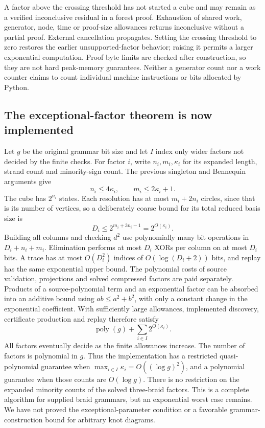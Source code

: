 A factor above the crossing threshold has not started a cube and may remain
as a verified inconclusive residual in a forest proof. Exhaustion of shared
work, generator, node, time or proof-size allowances returns inconclusive
without a partial proof. External cancellation propagates. Setting the
crossing threshold to zero restores the earlier unsupported-factor behavior;
raising it permits a larger exponential computation. Proof byte limits are
checked after construction, so they are not hard peak-memory guarantees.
Neither a generator count nor a work counter claims to count individual
machine instructions or bits allocated by Python.

\subsection{The exceptional-factor theorem is now implemented}

Let $g$ be the original grammar bit size and let $I$ index only wider factors
not decided by the finite checks. For factor $i$, write $n_i,m_i,\kappa_i$ for
its expanded length, strand count and minority-sign count. The previous
singleton and Bennequin arguments give
\[
 n_i\le4\kappa_i,\qquad m_i\le2\kappa_i+1.
\]
The cube has $2^{n_i}$ states. Each resolution has at most $m_i+2n_i$ circles,
since that is its number of vertices, so a deliberately coarse bound for its
total reduced basis size is
\[
 D_i\le 2^{m_i+3n_i-1}=2^{O(\kappa_i)}.
\]
Building all columns and checking $d^2$ use polynomially many bit operations
in $D_i+n_i+m_i$. Elimination performs at most $D_i$ XORs per column on at
most $D_i$ bits. A trace has at most $O(D_i^2)$ indices of $O(\log(D_i+2))$
bits, and replay has the same exponential upper bound. The polynomial costs
of source validation, projections and solved compressed factors are paid
separately. Products of a source-polynomial term and an exponential factor
can be absorbed into an additive bound using $ab\le a^2+b^2$, with only a
constant change in the exponential coefficient. With sufficiently large
allowances, implemented discovery,
certificate production and replay therefore satisfy
\[
 \operatorname{poly}(g)+\sum_{i\in I}2^{O(\kappa_i)}.
\]
All factors eventually decide as the finite allowances increase. The number
of factors is polynomial in $g$. Thus the implementation has a restricted
quasi-polynomial guarantee when
$\max_{i\in I}\kappa_i=O((\log g)^2)$, and a polynomial guarantee when those
counts are $O(\log g)$. There is no restriction on the expanded minority
counts of the solved three-braid factors. This is a complete algorithm for
supplied braid grammars, but an exponential worst case remains. We have not
proved the exceptional-parameter condition or a favorable grammar-construction
bound for arbitrary knot diagrams.


